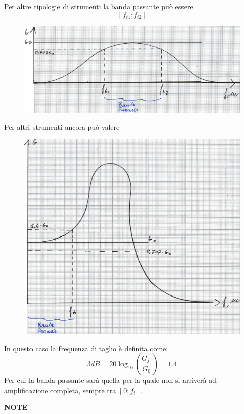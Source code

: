 \documentclass[a4paper, 15pt]{article}
\begin{document}
\begin{adjustwidth}{2in}{}
	Per altre tipologie di strumenti la banda passante può essere 
	\[[f_{t1};f_{t2}]\]
\begin{figure}[H]
	\centering
	\includegraphics[width=0.5\linewidth]{fig/mm2}
	\label{fig:mm2}
\end{figure}
\newpage
	Per altri strumenti ancora può valere	
\begin{figure}[H]
	\centering
	\includegraphics[width=0.5\linewidth]{fig/mm3}
	\label{fig:mm3}
\end{figure}
	In questo caso la frequenza di taglio è definita come:
	\[3dB = 20 \log_{10}\left( \dfrac{G_{f_t}}{G_0}\right)  = 1.4\]
	Per cui la banda passante sarà quella per la quale non si arriverà ad amplificazione completa, sempre tra $ [0;f_t] $. 
\end{adjustwidth}

\newpage

\begin{adjustwidth}{2in}{}
	\textbf{{\LARGE NOTE}}
\end{adjustwidth}
	
\end{document}
